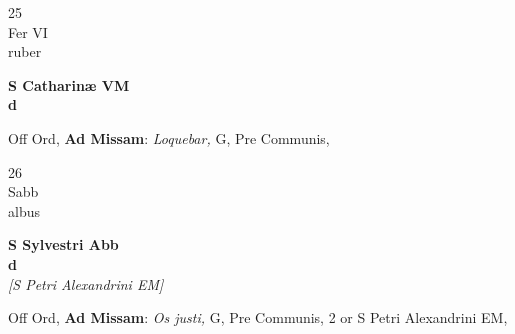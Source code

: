 \documentclass[10pt, openany]{book}
\begin{document}
        \begin{center}
            \begin{minipage}{3.5in}
                \vspace{2em}
                \begin{minipage}{0.5in}
                    {\Huge 25} \\
                    {\normalsize Fer VI} \\
                    {\normalsize ruber}
                \end{minipage}
                \begin{minipage}{3.0in}
                    \textbf{ \large S Catharinæ VM \\
                    \textnormal{\normalsize d}} \\ 
                \end{minipage}
                \begin{justify}Off Ord, \textbf{Ad Missam}: \textit{Loquebar,} G, Pre Communis,  
                \end{justify}
            \end{minipage}
        \end{center}
    
        \begin{center}
            \begin{minipage}{3.5in}
                \vspace{2em}
                \begin{minipage}{0.5in}
                    {\Huge 26} \\
                    {\normalsize Sabb} \\
                    {\normalsize albus}
                \end{minipage}
                \begin{minipage}{3.0in}
                    \textbf{ \large S Sylvestri Abb \\
                    \textnormal{\normalsize d}} \\ \textit{[S Petri Alexandrini EM]} \\ 
                \end{minipage}
                \begin{justify}Off Ord, \textbf{Ad Missam}: \textit{Os justi,} G, Pre Communis, 2 or S Petri Alexandrini EM,  
                \end{justify}
            \end{minipage}
        \end{center}
    
\end{document}
